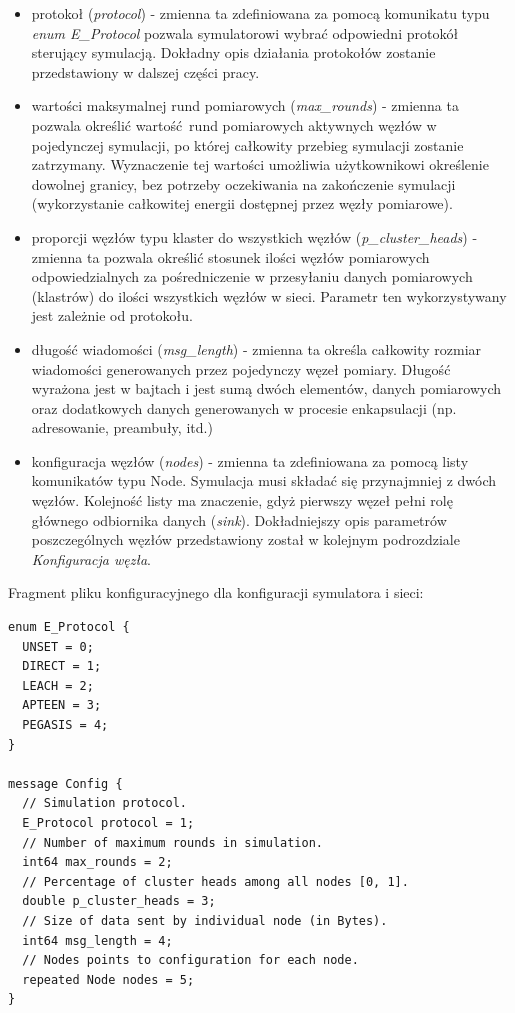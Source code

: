 \documentclass[a4paper,12pt,twoside,openany]{report}
\begin{document}
\begin{itemize}
 \item protokoł (\textit{protocol}) - zmienna ta zdefiniowana za pomocą komunikatu typu \textit{enum E\_Protocol} pozwala symulatorowi wybrać odpowiedni 
       protokół sterujący symulacją. Dokładny opis działania protokołów zostanie przedstawiony w dalszej części pracy.
 \item wartości maksymalnej rund pomiarowych (\textit{max\_rounds}) - zmienna ta pozwala określić wartość rund pomiarowych aktywnych węzłów w pojedynczej symulacji, 
       po której całkowity przebieg symulacji zostanie zatrzymany.
       Wyznaczenie tej wartości umożliwia użytkownikowi określenie dowolnej granicy, bez potrzeby oczekiwania na zakończenie symulacji (wykorzystanie 
       całkowitej energii dostępnej przez węzły pomiarowe).
 \item proporcji węzłów typu klaster do wszystkich węzłów (\textit{p\_cluster\_heads}) - zmienna ta pozwala określić stosunek ilości węzłów pomiarowych 
       odpowiedzialnych za pośredniczenie w przesyłaniu danych pomiarowych (klastrów) do ilości wszystkich węzłów w sieci. Parametr ten wykorzystywany jest
       zależnie od protokołu.
 \item długość wiadomości (\textit{msg\_length}) - zmienna ta określa całkowity rozmiar wiadomości generowanych przez pojedynczy węzeł pomiary.
       Długość wyrażona jest w bajtach i jest sumą dwóch elementów, danych pomiarowych oraz dodatkowych danych generowanych w procesie enkapsulacji
       (np. adresowanie, preambuły, itd.)
 \item konfiguracja węzłów (\textit{nodes}) - zmienna ta zdefiniowana za pomocą listy komunikatów typu Node. Symulacja musi składać się przynajmniej z dwóch węzłów.
       Kolejność listy ma znaczenie, gdyż pierwszy węzeł pełni rolę głównego odbiornika danych (\textit{sink}).
       Dokładniejszy opis parametrów poszczególnych węzłów przedstawiony został w kolejnym podrozdziale \textit{Konfiguracja węzła}. 
\end{itemize}

Fragment pliku konfiguracyjnego dla konfiguracji symulatora i sieci:

\begin{lstlisting}
enum E_Protocol {
  UNSET = 0;
  DIRECT = 1;
  LEACH = 2;
  APTEEN = 3;
  PEGASIS = 4;
}

message Config {
  // Simulation protocol.
  E_Protocol protocol = 1;
  // Number of maximum rounds in simulation. 
  int64 max_rounds = 2;
  // Percentage of cluster heads among all nodes [0, 1].
  double p_cluster_heads = 3;
  // Size of data sent by individual node (in Bytes).
  int64 msg_length = 4;
  // Nodes points to configuration for each node.
  repeated Node nodes = 5;
}
\end{lstlisting}
\end{document}
